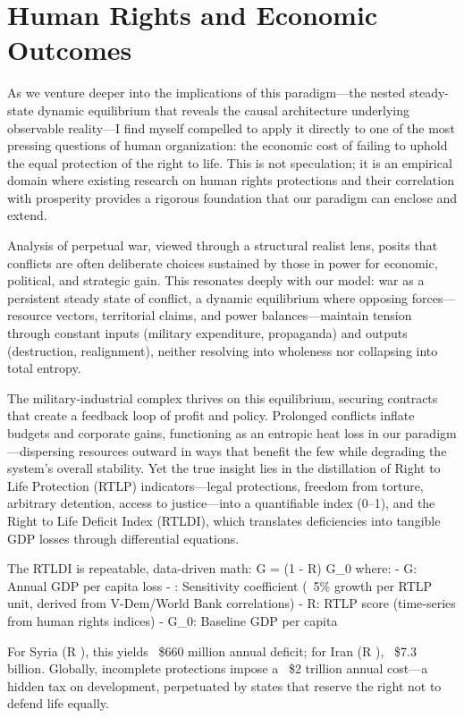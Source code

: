 \chapter{Human Rights and Economic Outcomes}

As we venture deeper into the implications of this paradigm—the nested steady-state dynamic equilibrium that reveals the causal architecture underlying observable reality—I find myself compelled to apply it directly to one of the most pressing questions of human organization: the economic cost of failing to uphold the equal protection of the right to life. This is not speculation; it is an empirical domain where existing research on human rights protections and their correlation with prosperity provides a rigorous foundation that our paradigm can enclose and extend.

Analysis of perpetual war, viewed through a structural realist lens, posits that conflicts are often deliberate choices sustained by those in power for economic, political, and strategic gain. This resonates deeply with our model: war as a persistent steady state of conflict, a dynamic equilibrium where opposing forces—resource vectors, territorial claims, and power balances—maintain tension through constant inputs (military expenditure, propaganda) and outputs (destruction, realignment), neither resolving into wholeness nor collapsing into total entropy.

The military-industrial complex thrives on this equilibrium, securing contracts that create a feedback loop of profit and policy. Prolonged conflicts inflate budgets and corporate gains, functioning as an entropic heat loss in our paradigm—dispersing resources outward in ways that benefit the few while degrading the system’s overall stability. Yet the true insight lies in the distillation of Right to Life Protection (RTLP) indicators—legal protections, freedom from torture, arbitrary detention, access to justice—into a quantifiable index (0–1), and the Right to Life Deficit Index (RTLDI), which translates deficiencies into tangible GDP losses through differential equations.

The RTLDI is repeatable, data-driven math:  
\Delta G = \eta (1 - R) \cdot G_0  
where:  
- \Delta G: Annual GDP per capita loss  
- \eta: Sensitivity coefficient (~5\% growth per RTLP unit, derived from V-Dem/World Bank correlations)  
- R: RTLP score (time-series from human rights indices)  
- G_0: Baseline GDP per capita  

For Syria (R ), this yields ~\$660 million annual deficit; for Iran (R ), ~\$7.3 billion. Globally, incomplete protections impose a ~\$2 trillion annual cost—a hidden tax on development, perpetuated by states that reserve the right not to defend life equally.

